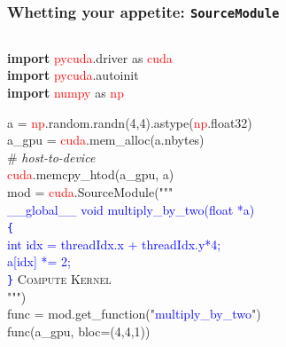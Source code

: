 \documentclass[]{beamer}
\begin{document}
\begin{frame}
    \frametitle{Whetting your appetite: \texttt{SourceModule}}
        \begin{columns}
            \begin{column}{\textwidth}
                \ttfamily\footnotesize
                {\bf import} \textcolor{red}{pycuda}.driver as \textcolor{red}{cuda}\\
                {\bf import} \textcolor{red}{pycuda}.autoinit\\
                {\bf import} \textcolor{red}{numpy} as \textcolor{red}{np}
                
                a = \textcolor{red}{np}.random.randn(4,4).astype(\textcolor{red}{np}.float32)\\
                a\_gpu = \textcolor{red}{cuda}.mem\_alloc(a.nbytes) \\
                \# \textit{host-to-device}\\
                \textcolor{red}{cuda}.memcpy\_htod(a\_gpu, a) \\
                \vspace{2mm}
                mod = \textcolor{red}{cuda}.SourceModule("""\\
                    \textcolor{blue}{\_\_global\_\_ void multiply\_by\_two(float *a)\\
                    \texttt{\{}\\
                    int idx = threadIdx.x + threadIdx.y*4;\\
                    a[idx] *= 2;\\
                    \texttt{\}}}
                    \hfill \textsc{Compute Kernel} \\
                    """)\\
                    \vspace{2mm}
                    func = mod.get\_function("\textcolor{blue}{multiply\_by\_two}")\\
                    func(a\_gpu, bloc=(4,4,1))
            \end{column}
                
        \end{columns}
\end{frame}
\end{document}
